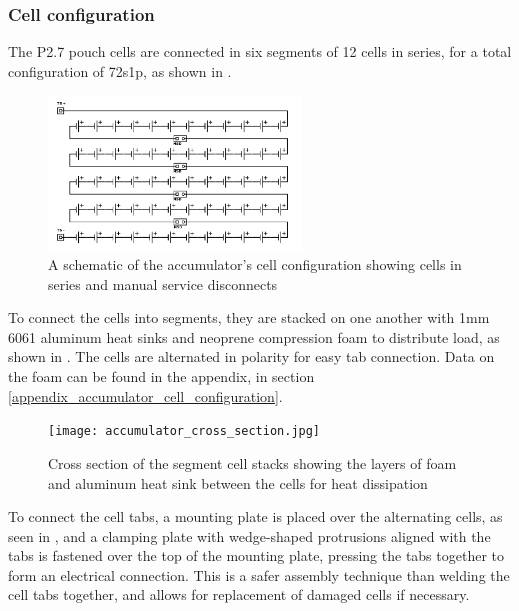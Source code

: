 \documentclass{article}
\begin{document}
\subsubsection{Cell configuration}\label{accumulator_cell_configuration}
The P2.7 pouch cells are connected in six segments of 12 cells in series, for a total configuration of 72s1p, as shown in . 

\begin{figure}[H]
\centering
\includegraphics[width=0.6\textwidth]{Cell-configuration-schematic.png}
\caption{A schematic of the accumulator's cell configuration showing cells in series and manual service disconnects}
\label{fig:cell_configuration_schematic}
\end{figure}

To connect the cells into segments, they are stacked on one another with 1mm 6061 aluminum heat sinks and neoprene compression foam to distribute load, as shown in . The cells are alternated in polarity for easy tab connection. Data on the foam can be found in the appendix, in section \ref{appendix_accumulator_cell_configuration}.

\begin{figure}
\centering
\texttt{[image: accumulator\_cross\_section.jpg]}
\caption{Cross section of the segment cell stacks showing the layers of foam and aluminum heat sink between the cells for heat dissipation}
\label{fig:cell_stack}
\end{figure}

To connect the cell tabs, a mounting plate is placed over the alternating cells, as seen in , and a clamping plate with wedge-shaped protrusions aligned with the tabs is fastened over the top of the mounting plate, pressing the tabs together to form an electrical connection. This is a safer assembly technique than welding the cell tabs together, and allows for replacement of damaged cells if necessary. 
\end{document}
